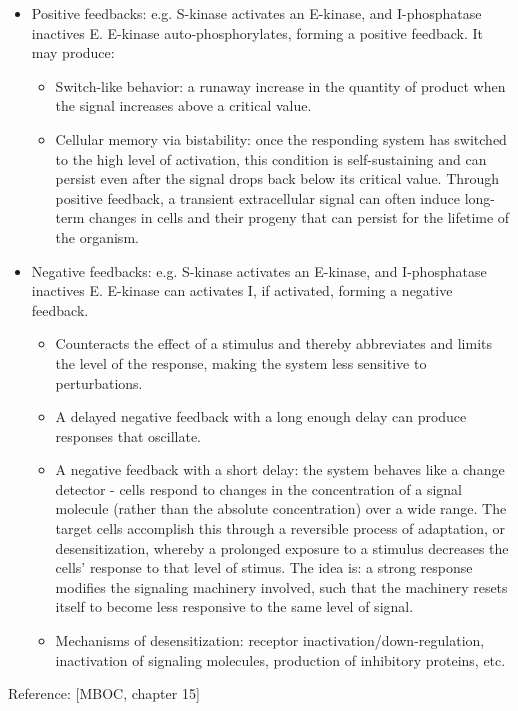 \documentclass{report}
\begin{document}
\begin{enumerate}
\begin{itemize}
\item Positive feedbacks: e.g. S-kinase activates an E-kinase, and I-phosphatase inactives E. E-kinase auto-phosphorylates, forming a positive feedback. It may produce: 
\begin{itemize}
	\item Switch-like behavior: a runaway increase in the quantity of product when the signal increases above a critical value. 
	\item Cellular memory via bistability: once the responding system has switched to the high level of activation, this condition is self-sustaining and can persist even after the signal drops back below its critical value. Through positive feedback, a transient extracellular signal can often induce long-term changes in cells and their progeny that can persist for the lifetime of the organism.
\end{itemize}

\item Negative feedbacks: e.g. S-kinase activates an E-kinase, and I-phosphatase inactives E. E-kinase can activates I, if activated, forming a negative feedback.  
\begin{itemize}
	\item Counteracts the effect of a stimulus and thereby abbreviates and limits the level of the response, making the system less sensitive to perturbations.
	\item A delayed negative feedback with a long enough delay can produce responses that oscillate.
	\item A negative feedback with a short delay: the system behaves like a change detector - cells respond to changes in the concentration of a signal molecule (rather than the absolute concentration) over a wide range. The target cells accomplish this through a reversible process of adaptation, or desensitization, whereby a prolonged exposure to a stimulus decreases the cells' response to that level of stimus. The idea is: a strong response modifies the signaling machinery involved, such that the machinery resets itself to become less responsive to the same level of signal. 
	\item Mechanisms of desensitization: receptor inactivation/down-regulation, inactivation of signaling molecules, production of inhibitory proteins, etc. 
\end{itemize}

\end{itemize}

Reference: [MBOC, chapter 15] 


\end{enumerate}
\end{document}
